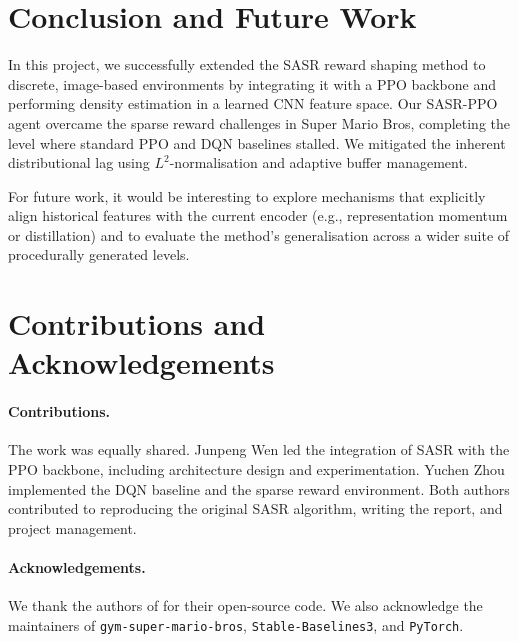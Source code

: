 \documentclass{article}
\begin{document}
\section{Conclusion and Future Work}
In this project, we successfully extended the SASR reward shaping method to discrete, image-based environments by integrating it with a PPO backbone and performing density estimation in a learned CNN feature space. Our SASR-PPO agent overcame the sparse reward challenges in Super Mario Bros, completing the level where standard PPO and DQN baselines stalled. We mitigated the inherent distributional lag using $L^2$-normalisation and adaptive buffer management. 

For future work, it would be interesting to explore mechanisms that explicitly align historical features with the current encoder (e.g., representation momentum or distillation) and to evaluate the method's generalisation across a wider suite of procedurally generated levels.

\section*{Contributions and Acknowledgements}

\paragraph*{Contributions.} The work was equally shared. Junpeng Wen led the integration of SASR with the PPO backbone, including architecture design and experimentation. Yuchen Zhou implemented the DQN baseline and the sparse reward environment. Both authors contributed to reproducing the original SASR algorithm, writing the report, and project management.

\paragraph*{Acknowledgements.} We thank the authors of \citet{ma2025sasr} for their open-source code. We also acknowledge the maintainers of \texttt{gym-super-mario-bros}, \texttt{Stable-Baselines3}, and \texttt{PyTorch}.

{
\small

 
}
\end{document}
